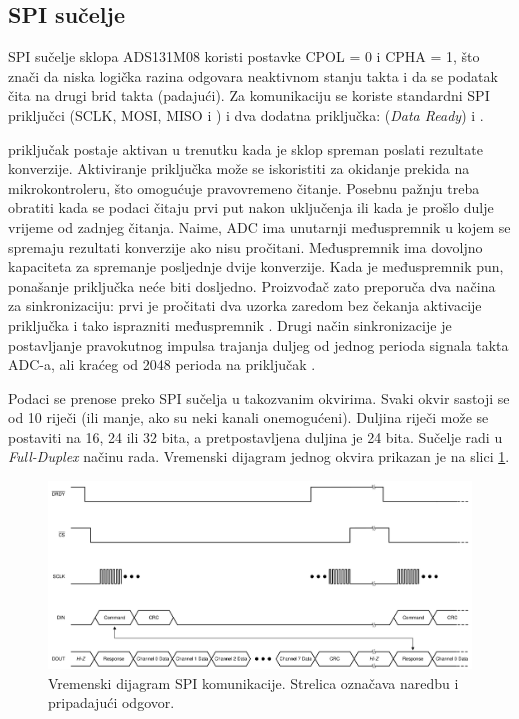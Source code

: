         \subsection{SPI sučelje}
            SPI sučelje sklopa ADS131M08 koristi postavke CPOL = 0 i CPHA = 1, što znači da niska logička razina odgovara neaktivnom stanju takta i da se podatak čita na drugi brid takta (padajući). Za komunikaciju se koriste standardni SPI priključci (SCLK, MOSI, MISO i ) i dva dodatna priključka:  (\textit{Data Ready}) i .
            
             priključak postaje aktivan u trenutku kada je sklop spreman poslati rezultate konverzije. Aktiviranje priključka može se iskoristiti za okidanje prekida na mikrokontroleru, što omogućuje pravovremeno čitanje. Posebnu pažnju treba obratiti kada se podaci čitaju prvi put nakon uključenja ili kada je prošlo dulje vrijeme od zadnjeg čitanja. Naime, ADC ima unutarnji međuspremnik u kojem se spremaju rezultati konverzije ako nisu pročitani. Međuspremnik ima dovoljno kapaciteta za spremanje posljednje dvije konverzije. Kada je međuspremnik pun, ponašanje priključka  neće biti dosljedno. Proizvođač zato preporuča dva načina za sinkronizaciju: prvi je pročitati dva uzorka zaredom bez čekanja aktivacije  priključka i tako isprazniti međuspremnik \cite[str.~40]{ads131m08_datasheet}. Drugi način sinkronizacije je postavljanje pravokutnog impulsa trajanja duljeg od jednog perioda signala takta ADC-a, ali kraćeg od 2048 perioda na priključak  \cite[str.~40, 46]{ads131m08_datasheet}.

            Podaci se prenose preko SPI sučelja u takozvanim okvirima. Svaki okvir sastoji se od 10 riječi (ili manje, ako su neki kanali onemogućeni). Duljina riječi može se postaviti na 16, 24 ili 32 bita, a pretpostavljena duljina je 24 bita. Sučelje radi u \textit{Full-Duplex} načinu rada. Vremenski dijagram jednog okvira prikazan je na slici \ref{fig:ads131m08_spi_vremenski_dijagram}.

            \begin{figure}[htb]
                \centering
                \includegraphics[width=\textwidth]{slike/ads131m08_spi_vremenski_dijagram.png}
                \caption{Vremenski dijagram SPI komunikacije. Strelica označava naredbu i pripadajući odgovor. \cite{ads131m08_datasheet}}
                \label{fig:ads131m08_spi_vremenski_dijagram}
            \end{figure}

